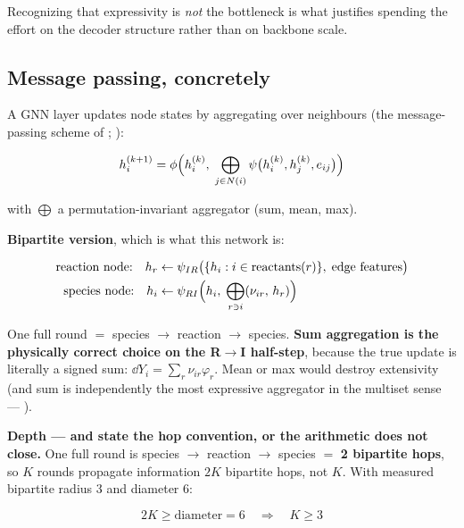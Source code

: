 Recognizing that expressivity is \emph{not} the bottleneck is what justifies
spending the effort on the decoder structure rather than on backbone scale.

\subsection{Message passing, concretely}
\label{sec:messagepassing}

A GNN layer updates node states by aggregating over neighbours (the
message-passing scheme of \citealt{gilmer2017}; \citealt{battaglia2018}):

\begin{equation}
h_i^{(k+1)} = \phi\Bigl(h_i^{(k)},\; \bigoplus_{j \in N(i)}
  \psi\bigl(h_i^{(k)}, h_j^{(k)}, e_{ij}\bigr)\Bigr)
\label{eq:message-passing}
\end{equation}

with $\bigoplus$ a permutation-invariant aggregator (sum, mean, max).

\textbf{Bipartite version}, which is what this network is:

\begin{align*}
\text{reaction node:}\quad h_r &\leftarrow
  \psi_{IR}\bigl(\{h_i : i \in \text{reactants}(r)\},\; \text{edge features}\bigr)\\
\text{species node:}\quad h_i &\leftarrow
  \psi_{RI}\Bigl(h_i,\; \bigoplus_{r \ni i} (\nu_{ir},\, h_r)\Bigr)
\end{align*}

One full round $=$ species $\to$ reaction $\to$ species. \textbf{Sum aggregation
is the physically correct choice on the R$\to$I half-step}, because the true
update is literally a signed sum: $\dd Y_i = \sum_r \nu_{ir} \varphi_r$. Mean or
max would destroy extensivity (and sum is independently the most expressive
aggregator in the multiset sense --- \citealt{xu2019}).

\textbf{Depth --- and state the hop convention, or the arithmetic does not
close.} One full round is species $\to$ reaction $\to$ species $=$ \textbf{2
bipartite hops}, so $K$ rounds propagate information $2K$ bipartite hops, not
$K$. With measured bipartite radius 3 and diameter 6:

\begin{equation*}
2K \geq \text{diameter} = 6 \quad\Longrightarrow\quad K \geq 3
\end{equation*}

